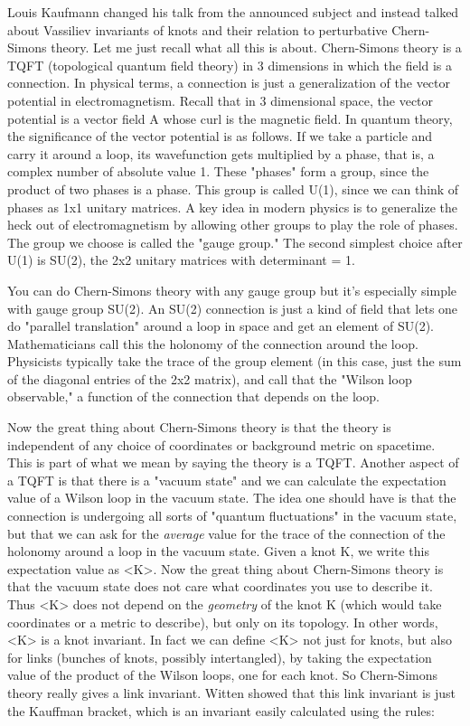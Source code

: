 Louis Kaufmann changed his talk from the announced subject and instead
talked about Vassiliev invariants of knots and their relation to
perturbative Chern-Simons theory.  Let me just recall what all this is
about.  Chern-Simons theory is a TQFT (topological quantum field theory)
in 3 dimensions in which the field is a connection.  In physical terms,
a connection is just a generalization of the vector potential in
electromagnetism.  Recall that in 3 dimensional space, the vector
potential is a vector field A whose curl is the magnetic field.  In
quantum theory, the significance of the vector potential is as follows.
If we take a particle and carry it around a loop, its wavefunction gets
multiplied by a phase, that is, a complex number of absolute value 1.
These "phases" form a group, since the product of two phases is a phase.
This group is called U(1), since we can think of phases as 1x1 unitary
matrices.  A key idea in modern physics is to generalize the heck out of
electromagnetism by allowing other groups to play the role of phases.
The group we choose is called the "gauge group."  The second simplest
choice after U(1) is SU(2), the 2x2 unitary matrices with determinant
 = 1. 

You can do Chern-Simons theory with any gauge group but it's especially
simple with gauge group SU(2).  An SU(2) connection is
just a kind of field that lets one do "parallel translation" around a
loop in space and get an element of SU(2).   Mathematicians call this
the holonomy of the connection around the loop.  Physicists
typically take the trace of the group element (in this case, just the
sum of the diagonal entries of the 2x2 matrix), and call that the
"Wilson loop observable," a function of the connection that depends on
the loop. 

Now the great thing about Chern-Simons theory is that the theory is
independent of any choice of coordinates or background metric on
spacetime.  This is part of what we mean by saying the theory is a
TQFT.   Another aspect of a TQFT is that there is a "vacuum state" and
we can calculate the expectation value of a Wilson loop in the vacuum state.
The idea one should have is that the connection is undergoing all sorts
of "quantum fluctuations" in the vacuum state, but that we can ask for
the \emph{average} value for the trace of the connection of the holonomy
around a loop in the vacuum state.  Given a knot K, we write this
expectation value as <K>.  Now the great thing about Chern-Simons theory
is that the vacuum state does not care what coordinates you use to
describe it.   Thus <K> does not depend on the \emph{geometry} of the knot K
(which would take coordinates or a metric to describe), but only on its
topology.  In other words, <K> is a knot invariant.  In fact we can
define <K> not just for knots, but also for links (bunches of knots,
possibly intertangled), by taking the expectation value of the product
of the Wilson loops, one for each knot.  So Chern-Simons theory really
gives a link invariant.   Witten showed that this link invariant is just
the Kauffman bracket, which is an invariant easily calculated using the rules: 

